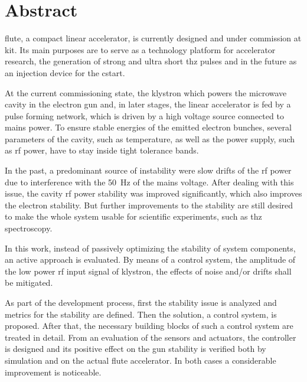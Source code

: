 \chapter*{Abstract}
\gls{flute}, a compact linear accelerator, is currently designed and under commission at \gls{kit}. Its main purposes are to serve as a technology platform for accelerator research, the generation of strong and ultra short \gls{thz} pulses and in the future as an injection device for the \gls{cstart}.

At the current commissioning state, the klystron which powers the microwave cavity in the electron gun and, in later stages, the linear accelerator is fed by a pulse forming network, which is driven by a high voltage source connected to mains power. To ensure stable energies of the emitted electron bunches, several parameters of the cavity, such as temperature, as well as the power supply, such as \gls{rf} power, have to stay inside tight tolerance bands.

In the past, a predominant source of instability were slow drifts of the \gls{rf} power due to interference with the \SI{50}{\hertz} of the mains voltage. After dealing with this issue, the cavity \gls{rf} power stability was improved significantly, which also improves the electron stability. But further improvements to the stability are still desired to make the whole system usable for scientific experiments, such as \gls{thz} spectroscopy.

In this work, instead of passively optimizing the stability of system components, an active approach is evaluated. By means of a control system, the amplitude of the low power \gls{rf} input signal of klystron, the effects of noise and/or drifts shall be mitigated.

As part of the development process, first the stability issue is analyzed and metrics for the stability are defined. Then the solution, a control system, is proposed. After that, the necessary building blocks of such a control system are treated in detail. From an evaluation of the sensors and actuators, the controller is designed and its positive effect on the gun stability is verified both by simulation and on the actual \gls{flute} accelerator. In both cases a considerable improvement is noticeable. 

\cleardoublepage
